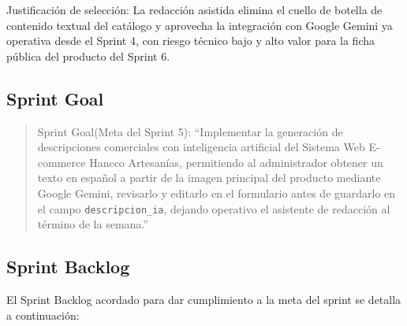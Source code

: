 \documentclass[12pt,a4paper]{article}
\begin{document}
Justificación de selección: La redacción asistida elimina el cuello de botella de contenido textual del catálogo y aprovecha la integración con Google Gemini ya operativa desde el Sprint 4, con riesgo técnico bajo y alto valor para la ficha pública del producto del Sprint 6.

\subsection*{Sprint Goal}

\begin{quote}
Sprint Goal(Meta del Sprint 5): ``Implementar la generación de descripciones comerciales con inteligencia artificial del Sistema Web E-commerce Hancco Artesanías, permitiendo al administrador obtener un texto en español a partir de la imagen principal del producto mediante Google Gemini, revisarlo y editarlo en el formulario antes de guardarlo en el campo \texttt{descripcion\_ia}, dejando operativo el asistente de redacción al término de la semana.''
\end{quote}

\subsection*{Sprint Backlog}

El Sprint Backlog acordado para dar cumplimiento a la meta del sprint se detalla a continuación:
\end{document}

